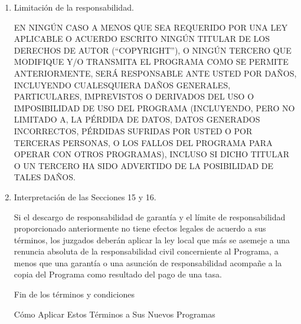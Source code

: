 \documentclass[11pt]{article}
\begin{document}
\begin{enumerate}
\begin{sloppypar}
 NO HAY GARANT\'{I}A PARA EL PROGRAMA, PARA LA EXTENSI\'{O}N PERMITIDA POR LA LEY 
APLICABLE. EXCEPTO CUANDO SE INDIQUE LO CONTRARIO POR ESCRITO, LOS TITULARES 
DE LOS DERECHOS DE AUTOR (``COPYRIGHT'') Y/O TERCEROS PROPORCIONAN EL PROGRAMA 
``TAL CUAL'' SIN GARANT\'{I}AS DE NING\'{U}N TIPO, BIEN SEAN EXPL\'{I}CITAS O IMPL\'{I}CITAS, 
INCLUYENDO, PERO NO LIMITADO A, LAS GARANT\'{I}AS IMPL\'{I}CITAS DE COMERCIALIZACI\'{O}N 
Y APTITUD PARA UN PROP\'{O}SITO PARTICULAR. EL RIESGO TOTAL EN CUANTO A CALIDAD 
Y RENDIMIENTO DEL PROGRAMA ES CON USTED. SI EL PROGRAMA PRESENTA ALG\'{U}N 
DEFECTO, USTED ASUME EL COSTO DE TODAS LAS REVISIONES NECESARIAS, 
REPARACIONES O CORRECCIONES.
\end{sloppypar}

\item Limitaci\'{o}n de la responsabilidad.

 EN NING\'{U}N CASO A MENOS QUE SEA REQUERIDO POR UNA LEY APLICABLE O ACUERDO ESCRITO NING\'{U}N TITULAR DE LOS DERECHOS DE AUTOR
(``COPYRIGHT''), O NING\'{U}N TERCERO QUE MODIFIQUE Y/O TRANSMITA EL PROGRAMA COMO SE PERMITE ANTERIORMENTE, SER\'{A} RESPONSABLE ANTE USTED POR DA\~NOS, INCLUYENDO CUALESQUIERA DA\~NOS GENERALES, PARTICULARES, IMPREVISTOS O DERIVADOS DEL USO O IMPOSIBILIDAD DE USO DEL PROGRAMA
 (INCLUYENDO, PERO NO LIMITADO A, LA P\'{E}RDIDA DE DATOS, DATOS GENERADOS INCORRECTOS, P\'{E}RDIDAS SUFRIDAS POR USTED O POR TERCERAS PERSONAS, O LOS FALLOS DEL PROGRAMA PARA OPERAR CON OTROS PROGRAMAS), INCLUSO SI DICHO TITULAR O UN TERCERO HA SIDO ADVERTIDO DE LA POSIBILIDAD DE TALES DA\~NOS.

\item Interpretaci\'{o}n de las Secciones 15 y 16.

Si el descargo de responsabilidad de garant\'{i}a y el l\'{i}mite de responsabilidad 
proporcionado anteriormente no tiene efectos legales de acuerdo a sus t\'{e}rminos, los juzgados deber\'{a}n aplicar la ley local que m\'{a}s se asemeje a una 
renuncia absoluta de la responsabilidad civil concerniente al Programa, a 
menos que una garant\'{i}a o una asunci\'{o}n de responsabilidad acompa\~ne a la copia 
del Programa como resultado del pago de una tasa.

\begin{center}
{\Large\sc Fin de los t\'{e}rminos y condiciones}

\bigskip
C\'{o}mo Aplicar Estos T\'{e}rminos a Sus Nuevos Programas
\end{center}


\end{enumerate}
\end{document}
